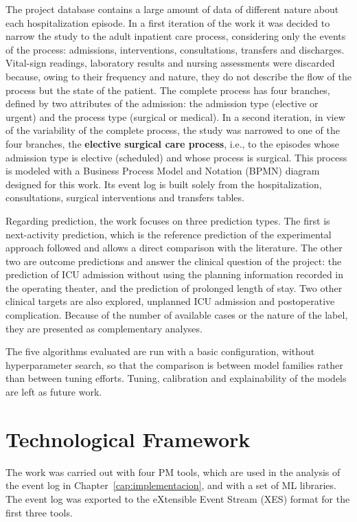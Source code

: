 The project database contains a large amount of data of different nature about each hospitalization episode. In a first iteration of the work it was decided to narrow the study to the adult inpatient care process, considering only the events of the process: admissions, interventions, consultations, transfers and discharges. Vital-sign readings, laboratory results and nursing assessments were discarded because, owing to their frequency and nature, they do not describe the flow of the process but the state of the patient. The complete process has four branches, defined by two attributes of the admission: the admission type (elective or urgent) and the process type (surgical or medical). In a second iteration, in view of the variability of the complete process, the study was narrowed to one of the four branches, the \textbf{elective surgical care process}, i.e., to the episodes whose admission type is elective (scheduled) and whose process is surgical. This process is modeled with a Business Process Model and Notation (BPMN) diagram designed for this work. Its event log is built solely from the hospitalization, consultations, surgical interventions and transfers tables.

Regarding prediction, the work focuses on three prediction types. The first is next-activity prediction, which is the reference prediction of the experimental approach followed and allows a direct comparison with the literature. The other two are outcome predictions and answer the clinical question of the project: the prediction of ICU admission without using the planning information recorded in the operating theater, and the prediction of prolonged length of stay. Two other clinical targets are also explored, unplanned ICU admission and postoperative complication. Because of the number of available cases or the nature of the label, they are presented as complementary analyses.

The five algorithms evaluated are run with a basic configuration, without hyperparameter search, so that the comparison is between model families rather than between tuning efforts. Tuning, calibration and explainability of the models are left as future work.

\section{Technological Framework}
\label{sec:marco}

The work was carried out with four PM tools, which are used in the analysis of the event log in Chapter~\ref{cap:implementacion}, and with a set of ML libraries. The event log was exported to the eXtensible Event Stream (XES) format for the first three tools.

